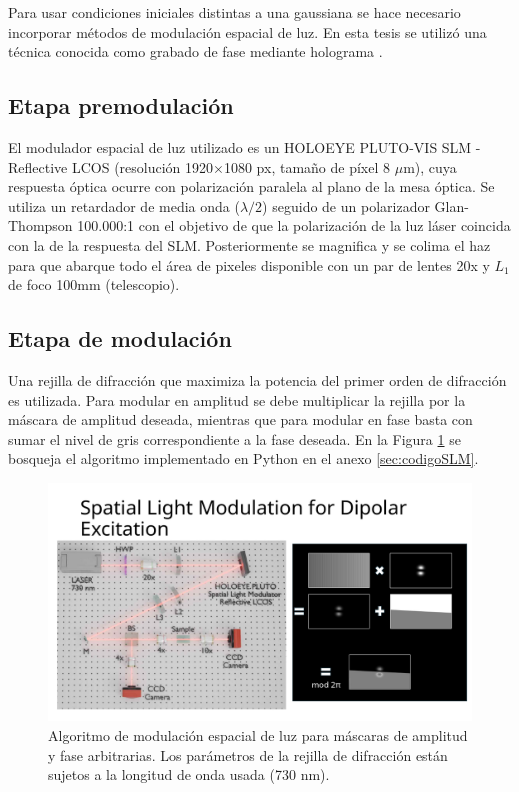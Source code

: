 Para usar condiciones iniciales distintas a una gaussiana se hace necesario incorporar métodos de modulación espacial de luz. En esta tesis se utilizó una técnica conocida como grabado de fase mediante holograma \citep{terhalle}.

\subsection{Etapa premodulación}
El modulador espacial de luz utilizado es un HOLOEYE PLUTO-VIS SLM - Reflective LCOS (resolución 1920$\times$1080 px, tamaño de píxel 8 $\mu$m), cuya respuesta óptica ocurre con polarización paralela al plano de la mesa óptica. Se utiliza un retardador de media onda ($\lambda/2$) seguido de un polarizador Glan-Thompson 100.000:1 con el objetivo de que la polarización de la luz láser coincida con la de la respuesta del SLM. Posteriormente se magnifica y se colima el haz para que abarque todo el área de pixeles disponible con un par de lentes 20x y $L_1$ de foco 100mm (telescopio).

\subsection{Etapa de modulación}
Una rejilla de difracción que maximiza la potencia del primer orden de difracción es utilizada. Para modular en amplitud se debe multiplicar la rejilla por la máscara de amplitud deseada, mientras que para modular en fase basta con sumar el nivel de gris correspondiente a la fase deseada. En la Figura \ref{fig:SLMblaze} se bosqueja el algoritmo implementado en Python en el anexo \ref{sec:codigoSLM}.

{
\begin{figure}
    \centering
    \includegraphics[width=0.35\linewidth, trim={19.5cm 0 0 5cm}, clip]{media/SLMblaze4.png}
    \caption[Modulación espacial de luz para máscaras de amplitud y fase arbitrarias.]{Algoritmo de modulación espacial de luz para máscaras de amplitud y fase arbitrarias. Los parámetros de la rejilla de difracción están sujetos a la longitud de onda usada (730 nm).\label{fig:SLMblaze}}
\end{figure}
}

